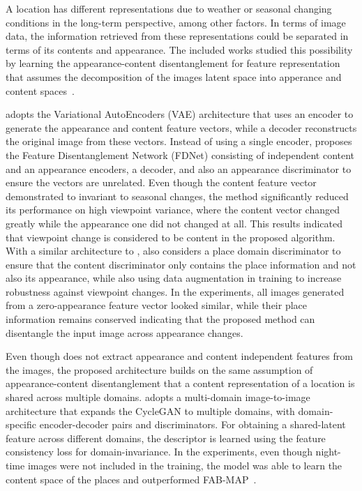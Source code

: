 A location has different representations due to weather or seasonal changing conditions in the long-term perspective, among other factors. In terms of image data, the information retrieved from these representations could be separated in terms of its contents and appearance. The included works studied this possibility by learning the appearance-content disentanglement for feature representation that assumes the decomposition of the images latent space into apperance and content spaces~\parencite{qin-et-al:2020:103561}.

\cite{oh-eoh:2021:app11198976} adopts the Variational AutoEncoders (VAE) architecture that uses an encoder to generate the appearance and content feature vectors, while a decoder reconstructs the original image from these vectors.
Instead of using a single encoder, \cite{qin-et-al:2020:103561} proposes the Feature Disentanglement Network (FDNet) consisting of independent content and an appearance encoders, a decoder, and also an appearance discriminator to ensure the vectors are unrelated. Even though the content feature vector demonstrated to invariant to seasonal changes, the method significantly reduced its performance on high viewpoint variance, where the content vector changed greatly while the appearance one did not changed at all. This results indicated that viewpoint change is considered to be content in the proposed algorithm.
With a similar architecture to \cite{qin-et-al:2020:103561}, \cite{tang-et-al:2021:17298814211037497} also considers a place domain discriminator to ensure that the content discriminator only contains the place information and not also its appearance, while also using data augmentation in training to increase robustness against viewpoint changes. In the experiments, all images generated from a zero-appearance feature vector looked similar, while their place information remains conserved indicating that the proposed method can disentangle the input image across appearance changes.

Even though \cite{hu-et-al:2022:1003907} does not extract appearance and content independent features from the images, the proposed architecture builds on the same assumption of appearance-content disentanglement that a content representation of a location is shared across multiple domains.
\cite{hu-et-al:2022:1003907} adopts a multi-domain image-to-image architecture that expands the CycleGAN to multiple domains, with domain-specific encoder-decoder pairs and discriminators.
For obtaining a shared-latent feature across different domains, the descriptor is learned using the feature consistency loss for domain-invariance.
In the experiments, even though night-time images were not included in the training, the model was able to learn the content space of the places and outperformed FAB-MAP~\parencite{discussion:fab-map}.



